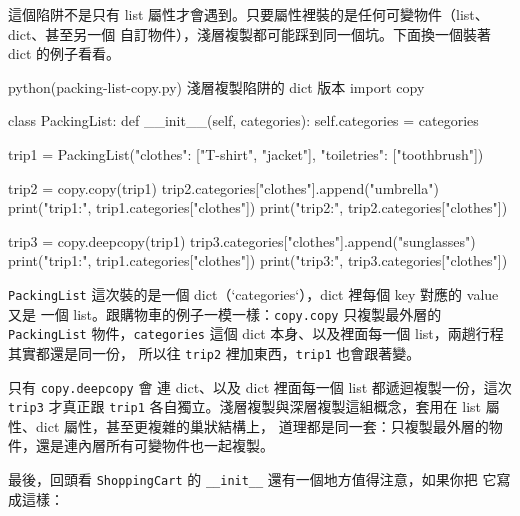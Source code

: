 
這個陷阱不是只有 list 屬性才會遇到。只要屬性裡裝的是任何可變物件（list、dict、甚至另一個
自訂物件），淺層複製都可能踩到同一個坑。下面換一個裝著 dict 的例子看看。

\begin{example}{python}{(packing-list-copy.py) 淺層複製陷阱的 dict 版本}
import copy


class PackingList:
    def __init__(self, categories):
        self.categories = categories


trip1 = PackingList({"clothes": ["T-shirt", "jacket"], "toiletries": ["toothbrush"]})

trip2 = copy.copy(trip1)
trip2.categories["clothes"].append("umbrella")
print("trip1:", trip1.categories["clothes"])
print("trip2:", trip2.categories["clothes"])

trip3 = copy.deepcopy(trip1)
trip3.categories["clothes"].append("sunglasses")
print("trip1:", trip1.categories["clothes"])
print("trip3:", trip3.categories["clothes"])
\end{example}


\texttt{PackingList} 這次裝的是一個 dict（`categories`），dict 裡每個 key 對應的 value 又是
一個 list。跟購物車的例子一模一樣：\texttt{copy.copy} 只複製最外層的 \texttt{PackingList}
物件，\texttt{categories} 這個 dict 本身、以及裡面每一個 list，兩趟行程其實都還是同一份，
所以往 \texttt{trip2} 裡加東西，\texttt{trip1} 也會跟著變。

只有 \texttt{copy.deepcopy} 會
連 dict、以及 dict 裡面每一個 list 都遞迴複製一份，這次 \texttt{trip3} 才真正跟 \texttt{trip1}
各自獨立。淺層複製與深層複製這組概念，套用在 list 屬性、dict 屬性，甚至更複雜的巢狀結構上，
道理都是同一套：只複製最外層的物件，還是連內層所有可變物件也一起複製。

最後，回頭看 \texttt{ShoppingCart} 的 \texttt{\_\_init\_\_} 還有一個地方值得注意，如果你把
它寫成這樣：


